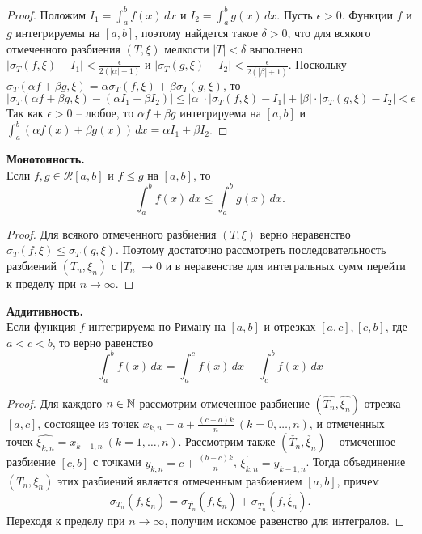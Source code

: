     \begin{proof}
        Положим $I_{1} = \int_{a}^{b} f(x) \,dx$ и $I_{2} = \int_{a}^{b} g(x) \,dx$. Пусть $\epsilon > 0$. Функции $f$ и $g$ интегрируемы на $[a, b]$, поэтому найдется такое $\delta > 0$, что для всякого отмеченного разбиения $(T, \xi)$ мелкости $|T| < \delta$ выполнено $|\sigma_{T}(f, \xi) - I_{1}| < \frac{\epsilon}{2(|\alpha| + 1)}$ и $|\sigma_{T}(g, \xi) - I_{2}| < \frac{\epsilon}{2(|\beta| + 1)}$. Поскольку $\sigma_{T}(\alpha f + \beta g, \xi) = \alpha \sigma_{T}(f, \xi) + \beta \sigma_{T}(g, \xi)$, то 
        \[|\sigma_{T}(\alpha f + \beta g, \xi) - (\alpha I_{1} + \beta I_{2})| \leq |\alpha| \cdot |\sigma_{T}(f, \xi) - I_{1}| + |\beta| \cdot |\sigma_{T}(g, \xi) - I_{2}| < \epsilon\]
        Так как $\epsilon> 0$ -- любое, то $\alpha f + \beta g$ интегрируема на $[a, b]$ и $\int_{a}^{b}(\alpha f(x) + \beta g(x)) \,dx = \alpha I_{1} + \beta I_{2}$.
    \end{proof}

    \textbf{Монотонность.}\\
    Если $f, g \in \mathcal{R}[a, b]$ и $f \leq g$ на $[a, b]$, то
    \[\int_{a}^{b} f(x) \,dx \leq \int_{a}^{b} g(x) \,dx.\]

    \begin{proof}
        Для всякого отмеченного разбиения $(T, \xi)$ верно неравенство $\sigma_{T}(f, \xi) \leq \sigma_{T}(g, \xi)$. Поэтому достаточно рассмотреть последовательность разбиений $(T_{n}, \xi_{n})$ с $|T_{n}| \to 0$ и в неравенстве для интегральных сумм перейти к пределу при $n \to \infty$.
    \end{proof}

    \textbf{Аддитивность.}\\
    Если функция $f$ интегрируема по Риману на $[a, b]$ и отрезках $[a, c], [c, b]$, где $a < c < b$, то верно равенство
    \[\int_{a}^{b}f(x) \,dx = \int_{a}^{c}f(x) \,dx + \int_{c}^{b}f(x) \,dx\]

    \begin{proof}
        Для каждого $n \in \mathbb{N}$ рассмотрим отмеченное разбиение $(\hat{T_{n}}, \hat{\xi_{n}})$ отрезка $[a, c]$, состоящее из точек $x_{k, n} = a + \frac{(c - a)k}{n} \ (k = 0, \dots, n)$, и отмеченных точек $\hat{\xi_{k, n}} = x_{k-1, n} \ (k = 1, \dots, n)$. Рассмотрим также $(\check{T_{n}}, \check{\xi_{n}})$ -- отмеченное разбиение $[c, b]$ с точками $y_{k, n} = c + \frac{(b - c)k}{n}$, $\check{\xi_{k, n}} = y_{k-1, n}$. Тогда объединение $(T_{n}, \xi_{n})$ этих разбиений является отмеченным разбиением $[a, b]$, причем
        \[\sigma_{T_{n}}(f, \xi_{n}) = \sigma_{\hat{T_{n}}}(f, \hat{\xi_{n}}) + \sigma_{\check{T}_{n}}(f, \check{\xi_{n}}).\]
        Переходя к пределу при $n \to \infty$, получим искомое равенство для интегралов.
    \end{proof}
    
